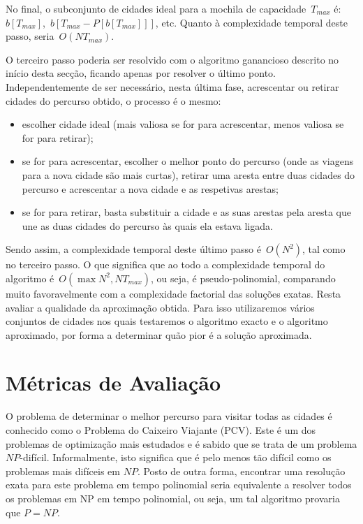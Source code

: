 \documentclass[12pt,a4paper,reqno]{report}
\numberwithin{figure}{section}
\numberwithin{equation}{section}
\begin{document}
No final, o subconjunto de cidades ideal para a mochila de capacidade~$T_{max}$ é:~$b[T_{max}]$,~$b[T_{max}-P[b[T_{max}]]]$, etc. Quanto à complexidade temporal deste passo, seria~$O(NT_{max})$.

O terceiro passo poderia ser resolvido com o algoritmo ganancioso descrito no início desta secção, ficando apenas por resolver o último ponto. Independentemente de ser necessário, nesta última fase, acrescentar ou retirar cidades do percurso obtido, o processo é o mesmo:
\begin{itemize}
	\item escolher cidade ideal (mais valiosa se for para acrescentar, menos valiosa se for para retirar);
	\item se for para acrescentar, escolher o melhor ponto do percurso (onde as viagens para a nova cidade são mais curtas), retirar uma aresta entre duas cidades do percurso e acrescentar a nova cidade e as respetivas arestas;
	\item se for para retirar, basta substituir a cidade e as suas arestas pela aresta que une as duas cidades do percurso às quais ela estava ligada.
\end{itemize}

Sendo assim, a complexidade temporal deste último passo é~$O(N^2)$, tal como no terceiro passo. O que significa que ao todo a complexidade temporal do algoritmo é~$O(\max{N^2,NT_{max}})$, ou seja, é pseudo-polinomial, comparando muito favoravelmente com a complexidade factorial das soluções exatas. Resta avaliar a qualidade da aproximação obtida. Para isso utilizaremos vários conjuntos de cidades nos quais testaremos o algoritmo exacto e o algoritmo aproximado, por forma a determinar quão pior é a solução aproximada.

\chapter{Métricas de Avaliação}

O problema de determinar o melhor percurso para visitar todas as cidades é conhecido como o Problema do Caixeiro Viajante (PCV). Este é um dos problemas de optimização mais estudados e é sabido que se trata de um problema $NP$-difícil. Informalmente, isto significa que é pelo menos tão difícil como os problemas mais difíceis em $NP$. Posto de outra forma, encontrar uma resolução exata para este problema em tempo polinomial seria equivalente a resolver todos os problemas em NP em tempo polinomial, ou seja, um tal algoritmo provaria que $P = NP$.
\end{document}
